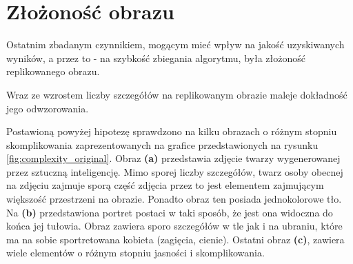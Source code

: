 \section{Złożoność obrazu}
Ostatnim zbadanym czynnikiem, mogącym mieć wpływ na jakość uzyskiwanych wyników, a przez to - na szybkość zbiegania algorytmu, była złożoność replikowanego obrazu. 

\begin{hypothesis}
Wraz ze wzrostem liczby szczegółów na replikowanym obrazie maleje dokładność jego odwzorowania.
\end{hypothesis}

Postawioną powyżej hipotezę sprawdzono na kilku obrazach o różnym stopniu skomplikowania zaprezentowanych na grafice przedstawionych na rysunku \ref{fig:complexity_original}. Obraz \textbf{(a)} przedstawia zdjęcie twarzy wygenerowanej przez sztuczną inteligencję. Mimo sporej liczby szczegółów, twarz osoby obecnej na zdjęciu zajmuje sporą część zdjęcia przez to jest elementem zajmującym większość przestrzeni na obrazie. Ponadto obraz ten posiada jednokolorowe tło. Na \textbf{(b)} przedstawiona portret postaci w taki sposób, że jest ona widoczna do końca jej tułowia. Obraz zawiera sporo szczegółów w tle jak i na ubraniu, które ma na sobie sportretowana kobieta (zagięcia, cienie). Ostatni obraz \textbf{(c)}, zawiera wiele elementów o różnym stopniu jasności i skomplikowania.

